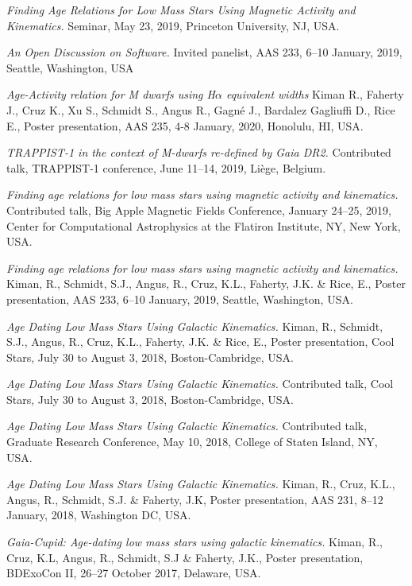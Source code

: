 \documentclass[10pt]{cv}
\begin{document}
\begin{llist}
\textit{Finding Age Relations for Low Mass Stars Using Magnetic Activity and Kinematics.} Seminar, May 23, 2019, Princeton University, NJ, USA. 

\textit{An Open Discussion on Software.} Invited panelist, AAS 233, 6--10 January, 2019, Seattle, Washington, USA


\textit{Age-Activity relation for M dwarfs using H$\alpha$ equivalent widths} Kiman R., Faherty J., Cruz K., Xu S., Schmidt S., Angus R., Gagn\'e J., Bardalez Gagliuffi D., Rice E., Poster presentation, AAS 235, 4-8 January, 2020, Honolulu, HI, USA.

\textit{TRAPPIST-1 in the context of M-dwarfs re-defined by Gaia DR2.} Contributed talk, TRAPPIST-1 conference, June 11--14, 2019, Li\`ege, Belgium.

\textit{Finding age relations for low mass stars using magnetic activity and kinematics.} Contributed talk, Big Apple Magnetic Fields Conference, January 24--25, 2019, Center for Computational Astrophysics at the Flatiron Institute, NY, New York, USA. 

\textit{Finding age relations for low mass stars using magnetic activity and kinematics.} Kiman, R., Schmidt, S.J., Angus, R., Cruz, K.L., Faherty, J.K. \& Rice, E., Poster presentation, AAS 233, 6--10 January, 2019, Seattle, Washington, USA.

\textit{Age Dating Low Mass Stars Using Galactic Kinematics.} Kiman, R., Schmidt, S.J., Angus, R., Cruz, K.L., Faherty, J.K. \& Rice, E., Poster presentation, Cool Stars, July 30 to August 3, 2018, Boston-Cambridge, USA.

\textit{Age Dating Low Mass Stars Using Galactic Kinematics.} Contributed talk, Cool Stars, July 30 to August 3, 2018, Boston-Cambridge, USA.

\textit{Age Dating Low Mass Stars Using Galactic Kinematics.} Contributed talk, Graduate Research Conference, May 10, 2018, College of Staten Island, NY, USA.

\textit{Age Dating Low Mass Stars Using Galactic Kinematics.} Kiman, R., Cruz, K.L., Angus, R., Schmidt, S.J. \& Faherty, J.K, Poster presentation, AAS 231, 8--12 January, 2018, Washington DC, USA. 

\textit{Gaia-Cupid: Age-dating low mass stars using galactic kinematics.} Kiman, R., Cruz, K.L, Angus, R., Schmidt, S.J \& Faherty, J.K., Poster presentation, BDExoCon II, 26--27 October 2017, Delaware, USA. 


\end{llist}
\end{document}
